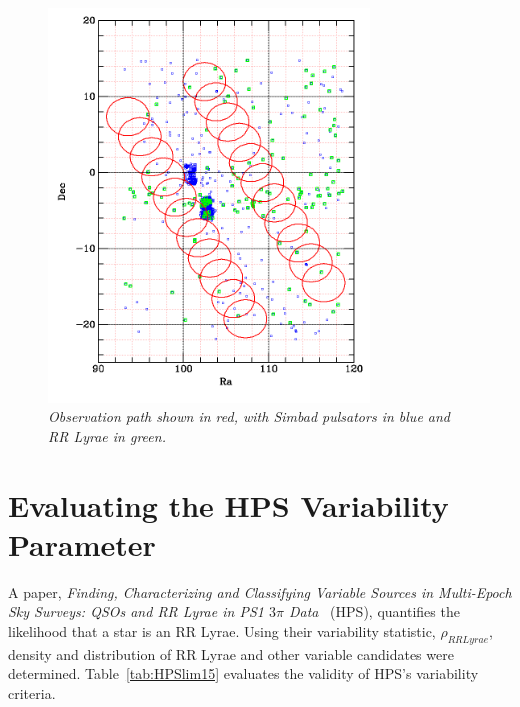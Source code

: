 \documentclass[aps,prb,twocolumn,superscriptaddress]{revtex4-1}
\begin{document}

\begin{figure}[H]
 \centering
 	\includegraphics[width=3.35in]{figures/simbadoverlap.png}
 \caption{\it \small{Observation path shown in red, with Simbad pulsators in blue and RR Lyrae in green.}}
 \label{fig:simoverlap}
\end{figure}



\section{Evaluating the HPS Variability Parameter}

A paper, \textit{Finding, Characterizing and Classifying Variable Sources in Multi-Epoch Sky Surveys: QSOs and RR Lyrae in PS1 $3\pi$ Data}~\cite{PSdata} (HPS), quantifies the likelihood that a star is an RR Lyrae.  Using their variability statistic, $\rho_{RRLyrae}$, density and distribution of RR Lyrae and other variable candidates were determined.  Table~\ref{tab:HPSlim15} evaluates the validity of HPS's variability criteria.
\end{document}
